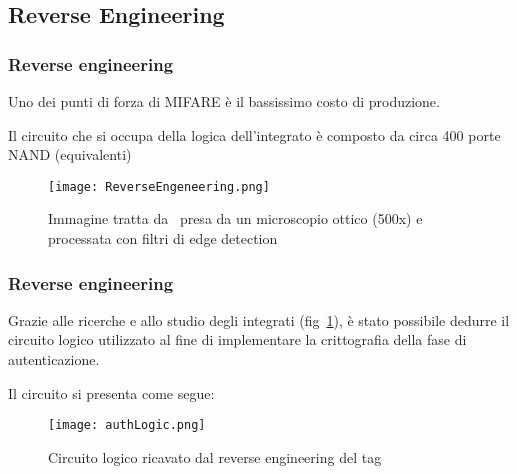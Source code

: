 \subsection{Reverse Engineering}

\begin{frame}
    \frametitle{Reverse engineering}
    Uno dei punti di forza di MIFARE è il bassissimo costo di produzione.

    Il circuito che si occupa della logica dell'integrato è composto da circa 400 porte NAND (equivalenti)~\cite{nohl2008reverse}

    \begin{figure}
        \centering
        \texttt{[image: ReverseEngeneering.png]}
        \caption{Immagine tratta da~\cite{nohl2008reverse} presa da un microscopio ottico (500x) e processata con filtri di edge detection}
        \label{fig:reverse-engeneering}
    \end{figure}
\end{frame}

\begin{frame}
    \frametitle{Reverse engineering}
    Grazie alle ricerche e allo studio degli integrati (fig~\ref{fig:reverse-engeneering}), è stato possibile dedurre il circuito logico utilizzato
    al fine di implementare la crittografia della fase di autenticazione.

    Il circuito si presenta come segue:
    \begin{figure}
        \centering
        \texttt{[image: authLogic.png]}
        \caption{Circuito logico ricavato dal reverse engineering del tag}
        \label{fig:reverse-engeneering-circuit}
    \end{figure}
\end{frame}


